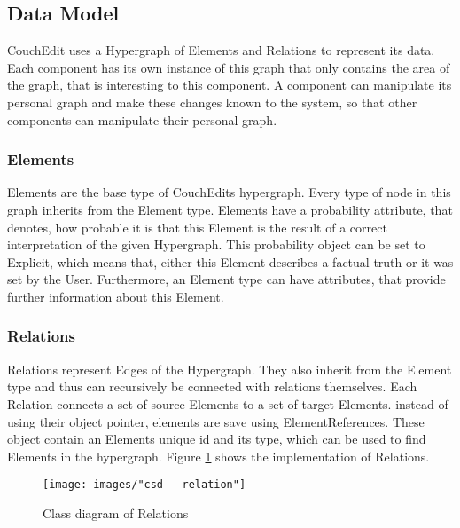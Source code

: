 \subsection{Data Model}
CouchEdit uses a Hypergraph of Elements and Relations to represent its data. Each component has its own instance of this graph that only contains the area of the graph, that is interesting to this component. A component can manipulate its personal graph and make these changes known to the system, so that other components can manipulate their personal graph.


\subsubsection{Elements}
Elements are the base type of CouchEdits hypergraph. Every type of node in this graph inherits from the Element type. Elements have a probability attribute, that denotes, how probable it is that this Element is the result of a correct interpretation of the given Hypergraph. This probability object can be set to Explicit, which means that, either this Element describes a factual truth or it was set by the User. Furthermore, an Element type can have attributes, that provide further information about this Element.



\subsubsection{Relations}
Relations represent Edges of the Hypergraph. They also inherit from the Element type and thus can recursively be connected with relations themselves. Each Relation connects a set of source Elements to a set of target Elements. instead of using their object pointer, elements are save using ElementReferences. These object contain an Elements unique id and its type, which can be used to find Elements in the hypergraph. Figure \ref{fig:relations} shows the implementation of Relations. 

\begin{figure}
  \centering
  \texttt{[image: images/"csd - relation"]}
  \caption{Class diagram of Relations}
  \label{fig:relations}
\end{figure}

